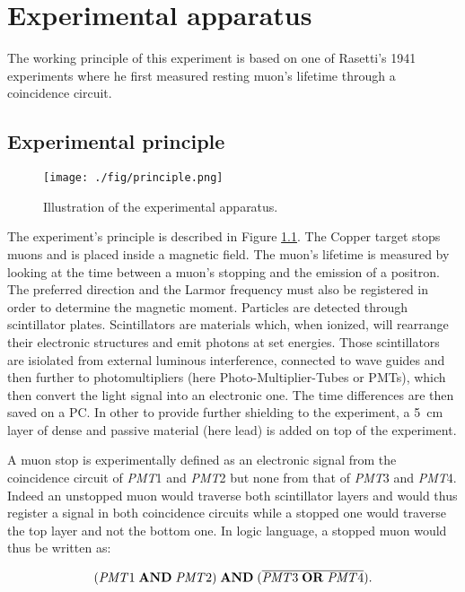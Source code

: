 \chapter{Experimental apparatus}

The working principle of this experiment is based on one of Rasetti's 1941 experiments where he first measured resting muon's lifetime through a coincidence circuit.

\section{Experimental principle}

\begin{figure}[htbp]
\centering
\texttt{[image: ./fig/principle.png]}
\caption{Illustration of the experimental apparatus.}
\label{fig:principle}
\end{figure}

The experiment's principle is described in Figure \ref{fig:principle}. The Copper target stops muons and is placed inside a magnetic field. The muon's lifetime is measured by looking at the time between a muon's stopping and the emission of a positron. The preferred direction and the Larmor frequency must also be registered in order to determine the magnetic moment. Particles are detected through scintillator plates. Scintillators are materials which, when ionized, will rearrange their electronic structures and emit photons at set energies. Those scintillators are isiolated from external luminous interference, connected to wave guides and then further to photomultipliers (here Photo-Multiplier-Tubes or PMTs), which then convert the light signal into an electronic one. The time differences are then saved on a PC. In other to provide further shielding to the experiment, a \SI{5}{\centi\meter} layer of dense and passive material (here lead) is added on top of the experiment.

A muon stop is experimentally defined as an electronic signal from the coincidence circuit of \textit{PMT}1 and \textit{PMT}2 but none from that of \textit{PMT}3 and \textit{PMT}4. Indeed an unstopped muon would traverse both scintillator layers and would thus register a signal in both coincidence circuits while a stopped one would traverse the top layer and not the bottom one. In logic language, a stopped muon would thus be written as:

\begin{equation}
(\text{\textit{PMT}1} \;\text{\textbf{AND}} \; \text{\textit{PMT}2}) \; \text{\textbf{AND}} \; (\overline{\text{\textit{PMT}3} \; \text{\textbf{OR}} \; \text{\textit{PMT}4}}).
\end{equation}

